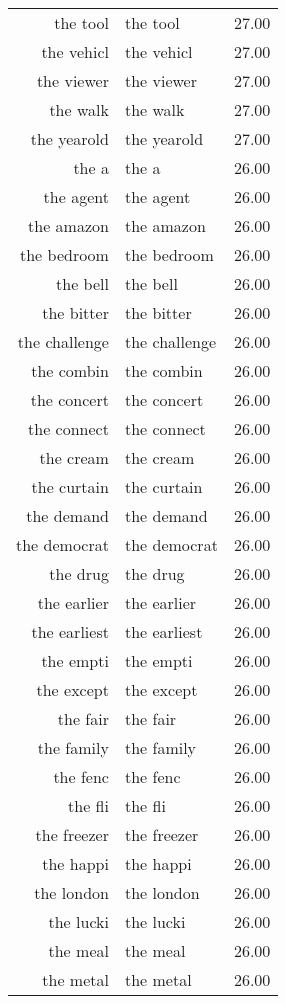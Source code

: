 \begin{table}[ht]
\begin{tabular}{rlr}
  the tool & the tool & 27.00 \\ 
  the vehicl & the vehicl & 27.00 \\ 
  the viewer & the viewer & 27.00 \\ 
  the walk & the walk & 27.00 \\ 
  the yearold & the yearold & 27.00 \\ 
  the a & the a & 26.00 \\ 
  the agent & the agent & 26.00 \\ 
  the amazon & the amazon & 26.00 \\ 
  the bedroom & the bedroom & 26.00 \\ 
  the bell & the bell & 26.00 \\ 
  the bitter & the bitter & 26.00 \\ 
  the challenge & the challenge & 26.00 \\ 
  the combin & the combin & 26.00 \\ 
  the concert & the concert & 26.00 \\ 
  the connect & the connect & 26.00 \\ 
  the cream & the cream & 26.00 \\ 
  the curtain & the curtain & 26.00 \\ 
  the demand & the demand & 26.00 \\ 
  the democrat & the democrat & 26.00 \\ 
  the drug & the drug & 26.00 \\ 
  the earlier & the earlier & 26.00 \\ 
  the earliest & the earliest & 26.00 \\ 
  the empti & the empti & 26.00 \\ 
  the except & the except & 26.00 \\ 
  the fair & the fair & 26.00 \\ 
  the family & the family & 26.00 \\ 
  the fenc & the fenc & 26.00 \\ 
  the fli & the fli & 26.00 \\ 
  the freezer & the freezer & 26.00 \\ 
  the happi & the happi & 26.00 \\ 
  the london & the london & 26.00 \\ 
  the lucki & the lucki & 26.00 \\ 
  the meal & the meal & 26.00 \\ 
  the metal & the metal & 26.00 \\ 

\end{tabular}
\end{table}
